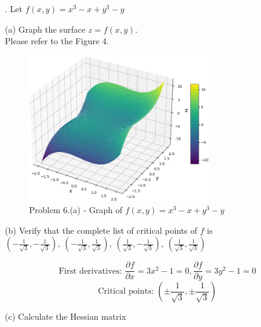 \documentclass{article} %
\begin{document}
{    . Let $ f(x, y) = x^3 - x + y^3 - y $

    \noindent(a) Graph the surface $ z = f(x, y) $. \\

    Please refer to the Figure 4. \\

    \begin{figure}[h!]
    \centering
    \includegraphics[width=0.7\textwidth]{generated_image3.png}
    \caption{Problem 6.(a) - Graph of $f(x, y) = x^3 - x + y^3 - y$}
    \label{fig4}
    \end{figure}

    \noindent (b) Verify that the complete list of critical points of $ f $ is
    \( %
    \left(-\frac{1}{\sqrt{3}}, -\frac{1}{\sqrt{3}}\right),\ %
    \left(-\frac{1}{\sqrt{3}}, \frac{1}{\sqrt{3}}\right),\ 
    \left(\frac{1}{\sqrt{3}}, -\frac{1}{\sqrt{3}}\right),\ 
    \left(\frac{1}{\sqrt{3}}, \frac{1}{\sqrt{3}}\right)
    \)

    \[ \text{First derivatives: }
    \frac{\partial f}{\partial x} = 3x^2 - 1=0, 
    \frac{\partial f}{\partial y} = 3y^2 - 1=0 \]
    \[ \text{Critical points: }
    \left( \pm \frac{1}{\sqrt{3}}, \pm \frac{1}{\sqrt{3}} \right) \]

    \noindent (c) Calculate the Hessian matrix

}
\end{document}
